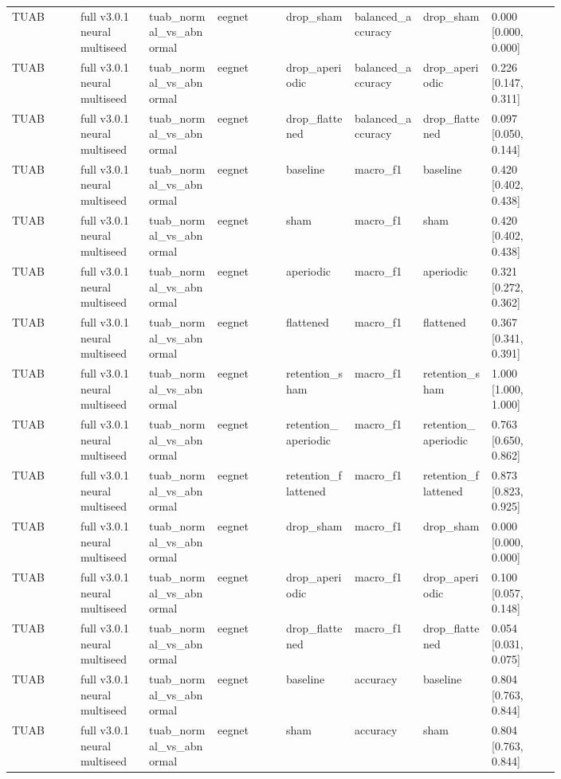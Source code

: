 \begin{longtable}{p{0.10\linewidth}p{0.10\linewidth}p{0.10\linewidth}p{0.10\linewidth}p{0.10\linewidth}p{0.10\linewidth}p{0.10\linewidth}p{0.10\linewidth}}
TUAB & full v3.0.1 neural multiseed & tuab\_normal\_vs\_abnormal & eegnet & drop\_sham & balanced\_accuracy & drop\_sham & 0.000 [0.000, 0.000]\\
TUAB & full v3.0.1 neural multiseed & tuab\_normal\_vs\_abnormal & eegnet & drop\_aperiodic & balanced\_accuracy & drop\_aperiodic & 0.226 [0.147, 0.311]\\
TUAB & full v3.0.1 neural multiseed & tuab\_normal\_vs\_abnormal & eegnet & drop\_flattened & balanced\_accuracy & drop\_flattened & 0.097 [0.050, 0.144]\\
TUAB & full v3.0.1 neural multiseed & tuab\_normal\_vs\_abnormal & eegnet & baseline & macro\_f1 & baseline & 0.420 [0.402, 0.438]\\
TUAB & full v3.0.1 neural multiseed & tuab\_normal\_vs\_abnormal & eegnet & sham & macro\_f1 & sham & 0.420 [0.402, 0.438]\\
TUAB & full v3.0.1 neural multiseed & tuab\_normal\_vs\_abnormal & eegnet & aperiodic & macro\_f1 & aperiodic & 0.321 [0.272, 0.362]\\
TUAB & full v3.0.1 neural multiseed & tuab\_normal\_vs\_abnormal & eegnet & flattened & macro\_f1 & flattened & 0.367 [0.341, 0.391]\\
TUAB & full v3.0.1 neural multiseed & tuab\_normal\_vs\_abnormal & eegnet & retention\_sham & macro\_f1 & retention\_sham & 1.000 [1.000, 1.000]\\
TUAB & full v3.0.1 neural multiseed & tuab\_normal\_vs\_abnormal & eegnet & retention\_aperiodic & macro\_f1 & retention\_aperiodic & 0.763 [0.650, 0.862]\\
TUAB & full v3.0.1 neural multiseed & tuab\_normal\_vs\_abnormal & eegnet & retention\_flattened & macro\_f1 & retention\_flattened & 0.873 [0.823, 0.925]\\
TUAB & full v3.0.1 neural multiseed & tuab\_normal\_vs\_abnormal & eegnet & drop\_sham & macro\_f1 & drop\_sham & 0.000 [0.000, 0.000]\\
TUAB & full v3.0.1 neural multiseed & tuab\_normal\_vs\_abnormal & eegnet & drop\_aperiodic & macro\_f1 & drop\_aperiodic & 0.100 [0.057, 0.148]\\
TUAB & full v3.0.1 neural multiseed & tuab\_normal\_vs\_abnormal & eegnet & drop\_flattened & macro\_f1 & drop\_flattened & 0.054 [0.031, 0.075]\\
TUAB & full v3.0.1 neural multiseed & tuab\_normal\_vs\_abnormal & eegnet & baseline & accuracy & baseline & 0.804 [0.763, 0.844]\\
TUAB & full v3.0.1 neural multiseed & tuab\_normal\_vs\_abnormal & eegnet & sham & accuracy & sham & 0.804 [0.763, 0.844]\\

\end{longtable}
